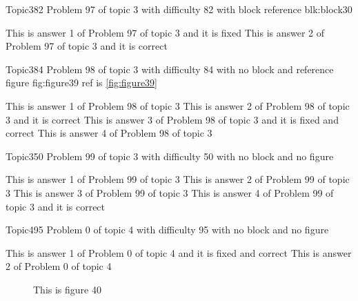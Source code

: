 \documentclass[master]{exam}
\begin{document}
\begin{problem}[requires=blk:block30]{Topic3}{82}
	Problem 97 of topic 3 with difficulty 82 with block reference blk:block30
	\begin{answers}
		\answer[fixed] This is answer 1 of Problem 97 of topic 3 and it is fixed
		\answer[correct] This is answer 2 of Problem 97 of topic 3 and it is correct
	\end{answers}
\end{problem}

\begin{problem}{Topic3}{84}
	Problem 98 of topic 3 with difficulty 84 with no block and reference figure fig:figure39 ref is \ref{fig:figure39}
	\begin{answers}
		\answer This is answer 1 of Problem 98 of topic 3 
		\answer[correct] This is answer 2 of Problem 98 of topic 3 and it is correct
		 This is answer 3 of Problem 98 of topic 3 and it is fixed and correct
		\answer This is answer 4 of Problem 98 of topic 3 
	\end{answers}
\end{problem}

\begin{problem}{Topic3}{50}
	Problem 99 of topic 3 with difficulty 50 with no block and no figure
	\begin{answers}
		\answer This is answer 1 of Problem 99 of topic 3 
		\answer This is answer 2 of Problem 99 of topic 3 
		\answer This is answer 3 of Problem 99 of topic 3 
		\answer[correct] This is answer 4 of Problem 99 of topic 3 and it is correct
	\end{answers}
\end{problem}

\begin{problem}{Topic4}{95}
	Problem 0 of topic 4 with difficulty 95 with no block and no figure
	\begin{answers}
		 This is answer 1 of Problem 0 of topic 4 and it is fixed and correct
		\answer This is answer 2 of Problem 0 of topic 4 
	\end{answers}
\end{problem}



\begin{figure}
	\begin{center}
		This is figure 40 
		\label{fig:figure40}
	\end{center}
\end{figure}
\end{document}
